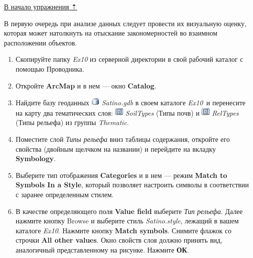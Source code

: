 \documentclass[]{book}
\theoremstyle{definition}
\theoremstyle{definition}
\theoremstyle{definition}
\theoremstyle{remark}
\begin{document}
\protect\hyperlink{overlay}{В начало упражнения ⇡}

В первую очередь при анализе данных следует провести их визуальную
оценку, которая может натолкнуть на отыскание закономерностей во
взаимном расположении объектов.

\begin{enumerate}
\def\labelenumi{\arabic{enumi}.}
\item
  Скопируйте папку \emph{Ex10} из серверной директории в свой рабочий
  каталог с помощью Проводника.
\item
  Откройте \textbf{ArcMap} и в нем --- окно \textbf{Catalog}.
\item
  Найдите базу геоданных \includegraphics{images/Ex10/image2.png}
  \emph{Satino.gdb} в своем каталоге \emph{Ex10}~и перенесите на карту
  два тематических слоя: \includegraphics{images/Ex10/image3.png}
  \emph{SoilTypes} (Типы почв) и
  \includegraphics{images/Ex10/image3.png} \emph{RelTypes} (Типы
  рельефа) из группы \emph{Thematic}.
\item
  Поместите слой \emph{Типы рельефа} вниз таблицы содержания, откройте
  его свойства (двойным щелчком на названии) и перейдите на вкладку
  \textbf{Symbology}.
\item
  Выберите тип отображения \textbf{Categories} и в нем --- режим
  \textbf{Match to Symbols In a Style}, который позволяет настроить
  символы в соответствии с заранее определенным стилем.
\item
  В качестве определяющего поля \textbf{Value field} выберите \emph{Тип
  рельефа}. Далее нажмите кнопку Browse и выберите стиль
  \emph{Satino.style}, лежащий в вашем каталоге \emph{Ex10}. Нажмите
  кнопку \textbf{Match symbols}. Снимите флажок со строчки \textbf{All
  other values}. Окно свойств слоя должно принять вид, аналогичный
  представленному на рисунке. Нажмите \textbf{ОК}.


\end{enumerate}
\end{document}
